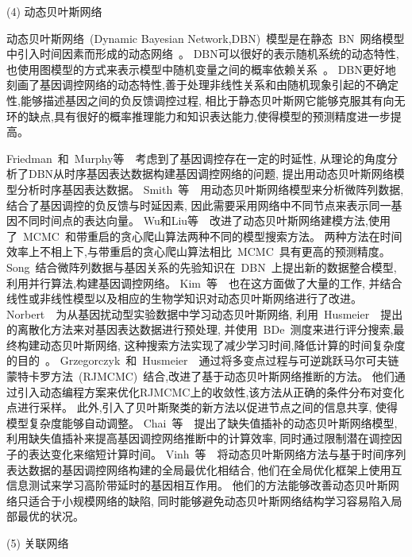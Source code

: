 (4) 动态贝叶斯网络

动态贝叶斯网络~(Dynamic Bayesian Network,DBN)~模型是在静态~BN~网络模型中引入时间因素而形成的动态网络~\cite{dondelinger2010heterogeneous,grzegorczyk2010improvements}。
DBN可以很好的表示随机系统的动态特性,也使用图模型的方式来表示模型中随机变量之间的概率依赖关系~\cite{hecker2009gene}。
DBN更好地刻画了基因调控网络的动态特性,善于处理非线性关系和由随机现象引起的不确定性,能够描述基因之间的负反馈调控过程,
相比于静态贝叶斯网它能够克服其有向无环的缺点,具有很好的概率推理能力和知识表达能力,使得模型的预测精度进一步提高。

Friedman~和~Murphy等~\cite{friedman2004inferring}~考虑到了基因调控存在一定的时延性,
从理论的角度分析了DBN从时序基因表达数据构建基因调控网络的问题, 提出用动态贝叶斯网络模型分析时序基因表达数据。
Smith~等~\cite{smith2006computational}~用动态贝叶斯网络模型来分析微阵列数据,
结合了基因调控的负反馈与时延因素, 因此需要采用网络中不同节点来表示同一基因不同时间点的表达向量。
Wu和Liu等~\cite{wu2008dynamic}~改进了动态贝叶斯网络建模方法,使用了~MCMC~和带重启的贪心爬山算法两种不同的模型搜索方法。 
两种方法在时间效率上不相上下,与带重启的贪心爬山算法相比~MCMC~具有更高的预测精度。
Song~\cite{song2009keller}结合微阵列数据与基因关系的先验知识在~DBN~上提出新的数据整合模型,利用并行算法,构建基因调控网络。
Kim~等~\cite{del2010efficient}~也在这方面做了大量的工作,
并结合线性或非线性模型以及相应的生物学知识对动态贝叶斯网络进行了改进。
Norbert~\cite{netrapalli2010greedy}~为从基因扰动型实验数据中学习动态贝叶斯网络,
利用~Husmeier~\cite{werhli2006comparative}~提出的离散化方法来对基因表达数据进行预处理,
并使用~BDe~测度来进行评分搜索,最终构建动态贝叶斯网络, 这种搜索方法实现了减少学习时间,降低计算的时间复杂度的目的~\cite{hurley2011gene}。
Grzegorczyk~和~Husmeier~\cite{grzegorczyk2010improvements}~通过将多变点过程与可逆跳跃马尔可夫链蒙特卡罗方法~(RJMCMC)~结合,改进了基于动态贝叶斯网络推断的方法。 他们通过引入动态编程方案来优化RJMCMC上的收敛性,该方法从正确的条件分布对变化点进行采样。 
此外,引入了贝叶斯聚类的新方法以促进节点之间的信息共享, 使得模型复杂度能够自动调整。
Chai~等~\cite{chai2012inferring}~提出了缺失值插补的动态贝叶斯网络模型,
利用缺失值插补来提高基因调控网络推断中的计算效率,
同时通过限制潜在调控因子的表达变化来缩短计算时间。
Vinh~等~\cite{vinh2012gene}~将动态贝叶斯网络方法与基于时间序列表达数据的基因调控网络构建的全局最优化相结合,
他们在全局优化框架上使用互信息测试来学习高阶带延时的基因相互作用。
他们的方法能够改善动态贝叶斯网络只适合于小规模网络的缺陷,
同时能够避免动态贝叶斯网络结构学习容易陷入局部最优的状况。

(5) 关联网络

